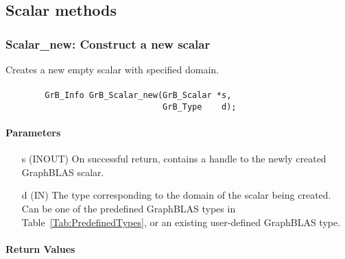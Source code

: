 \subsection{Scalar methods}


\subsubsection{{\sf Scalar\_new}: Construct a new scalar}

Creates a new empty scalar with specified domain.

\paragraph{\syntax}

\begin{verbatim}
        GrB_Info GrB_Scalar_new(GrB_Scalar *s,
                                GrB_Type    d);
\end{verbatim}

\paragraph{Parameters}

\begin{itemize}[leftmargin=1.1in]
    \item[{\sf s}] ({\sf INOUT}) On successful return, contains a handle
                                 to the newly created GraphBLAS scalar.
    \item[{\sf d}] ({\sf IN})    The type corresponding to the domain of the 
                                 scalar being created.  Can be one of the 
                                 predefined GraphBLAS types in 
                                 Table~\ref{Tab:PredefinedTypes}, or an existing 
                                 user-defined GraphBLAS type.
\end{itemize}

\paragraph{Return Values}

